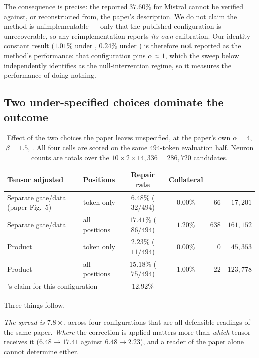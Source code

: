 The consequence is precise: the reported $37.60\%$ for Mistral cannot be verified
against, or reconstructed from, the paper's description. We do not claim the
method is unimplementable --- only that the published configuration is
unrecoverable, so any reimplementation reports \emph{its own} calibration. Our
identity-constant result ($1.01\%$ under \Ppaper{}, $0.24\%$ under \Pcode{}) is
therefore \textbf{not} reported as the method's performance: that configuration
pins $\alpha \approx 1$, which the sweep below independently identifies as the
null-intervention regime, so it measures the performance of doing nothing.

\subsection{Two under-specified choices dominate the outcome}

\begin{table}[h]
\centering
\caption{Effect of the two choices the paper leaves unspecified, at the paper's
own $\alpha = 4$, $\beta = 1.5$, \Ppaper{}. All four cells are scored on the same
$494$-token evaluation half. Neuron counts are totals over the
$10 \times 2 \times 14{,}336 = 286{,}720$ candidates.}
\label{tab:implchoice}
\begin{tabular}{llccrr}
\toprule
Tensor adjusted & Positions & Repair rate & Collateral & \Neunup{} & \Neundown{} \\
\midrule
Separate gate/data (paper Fig.~5) & token only    & $6.48\%$ ($32/494$)  & $0.00\%$ & $66$  & $17{,}201$ \\
Separate gate/data                & all positions & $17.41\%$ ($86/494$) & $1.20\%$ & $638$ & $161{,}152$ \\
Product                           & token only    & $2.23\%$ ($11/494$)  & $0.00\%$ & $0$   & $45{,}353$ \\
Product                           & all positions & $15.18\%$ ($75/494$) & $1.00\%$ & $22$  & $123{,}778$ \\
\midrule
\multicolumn{2}{l}{\gp{}'s claim for this configuration} & $12.92\%$ & --- & --- & --- \\
\bottomrule
\end{tabular}
\end{table}

Three things follow.

\emph{The spread is $7.8\times$}, across four configurations that are all
defensible readings of the same paper. \emph{Where} the correction is applied
matters more than \emph{which} tensor receives it ($6.48 \rightarrow 17.41$
against $6.48 \rightarrow 2.23$), and a reader of the paper alone cannot
determine either.


